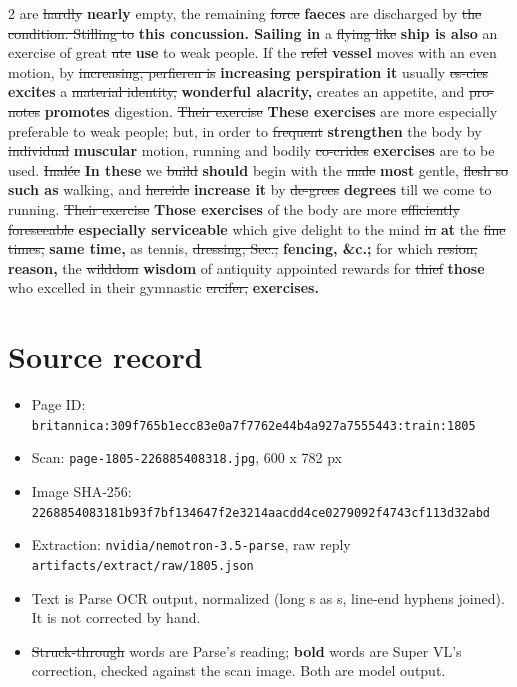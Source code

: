 \documentclass[10pt]{article}
\begin{document}
\begin{multicols}{2}
are \sout{hardly} \textbf{nearly} empty, the remaining \sout{force} \textbf{faeces} are discharged by \sout{the condition. Stilling to} \textbf{this concussion. Sailing in} a \sout{flying like} \textbf{ship is also} an exercise of great \sout{ute} \textbf{use} to weak people. If the \sout{refel} \textbf{vessel} moves with an even motion, by \sout{increasing, perfieren is} \textbf{increasing perspiration it} usually \sout{es-cies} \textbf{excites} a \sout{material identity,} \textbf{wonderful alacrity,} creates an appetite, and \sout{pro-notes} \textbf{promotes} digestion. \sout{Their exercise} \textbf{These exercises} are more especially preferable to weak people; but, in order to \sout{frequent} \textbf{strengthen} the body by \sout{individual} \textbf{muscular} motion, running and bodily \sout{co-crides} \textbf{exercises} are to be used. \sout{Inalée} \textbf{In these} we \sout{build} \textbf{should} begin with the \sout{male} \textbf{most} gentle, \sout{flesh so} \textbf{such as} walking, and \sout{hereide} \textbf{increase it} by \sout{de-grees} \textbf{degrees} till we come to running. \sout{Their exercise} \textbf{Those exercises} of the body are more \sout{efficiently foreseeable} \textbf{especially serviceable} which give delight to the mind \sout{in} \textbf{at} the \sout{fine times,} \textbf{same time,} as tennis, \sout{dressing, Sec.;} \textbf{fencing, \&c.;} for which \sout{resion,} \textbf{reason,} the \sout{wilddom} \textbf{wisdom} of antiquity appointed rewards for \sout{thief} \textbf{those} who excelled in their gymnastic \sout{ercifer,} \textbf{exercises.}
\end{multicols}
\section*{Source record}
\begin{itemize}
\item Page ID: \texttt{britannica:309f765b1ecc83e0a7f7762e44b4a927a7555443:train:1805}
\item Scan: \texttt{page-1805-226885408318.jpg}, 600 x 782 px
\item Image SHA-256: \texttt{\small 2268854083181b93f7bf134647f2e3214aacdd4ce0279092f4743cf113d32abd}
\item Extraction: \texttt{nvidia/nemotron-3.5-parse}, raw reply \texttt{artifacts/extract/raw/1805.json}
\item Text is Parse OCR output, normalized (long s as s, line-end hyphens joined). It is not corrected by hand.
\item \sout{Struck-through} words are Parse's reading; \textbf{bold} words are Super VL's correction, checked against the scan image. Both are model output.
\end{itemize}
\end{document}
